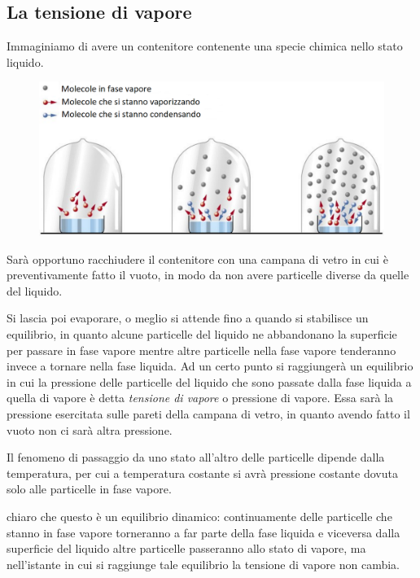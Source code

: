 \subsection{La tensione di vapore}
Immaginiamo di avere un contenitore contenente una specie chimica nello stato liquido.

\begin{figure}[htp]
    \centering
    \includegraphics[width=15cm]{immagini/campana_di_vetro}
\end{figure}

Sarà opportuno racchiudere il contenitore con una campana di vetro in cui è preventivamente fatto il vuoto, in modo da non avere particelle diverse da quelle del liquido.

Si lascia poi evaporare, o meglio si attende fino a quando si stabilisce un equilibrio, in quanto alcune particelle del liquido ne abbandonano la superficie per passare in fase vapore mentre altre particelle nella fase vapore tenderanno invece a tornare nella fase liquida. Ad un certo punto si raggiungerà un equilibrio in cui la pressione delle particelle del liquido che sono passate dalla fase liquida a quella di vapore è detta \textit{tensione di vapore} o pressione di vapore. Essa sarà la pressione esercitata sulle pareti della campana di vetro, in quanto avendo fatto il vuoto non ci sarà altra pressione.

Il fenomeno di passaggio da uno stato all'altro delle particelle dipende dalla temperatura, per cui a temperatura costante si avrà pressione costante dovuta solo alle particelle in fase vapore.

\vspace{0.2cm}\E chiaro che questo è un equilibrio dinamico: continuamente delle particelle che stanno in fase vapore torneranno a far parte della fase liquida e viceversa dalla superficie del liquido altre particelle passeranno allo stato di vapore, ma nell'istante in cui si raggiunge tale equilibrio la tensione di vapore non cambia.

